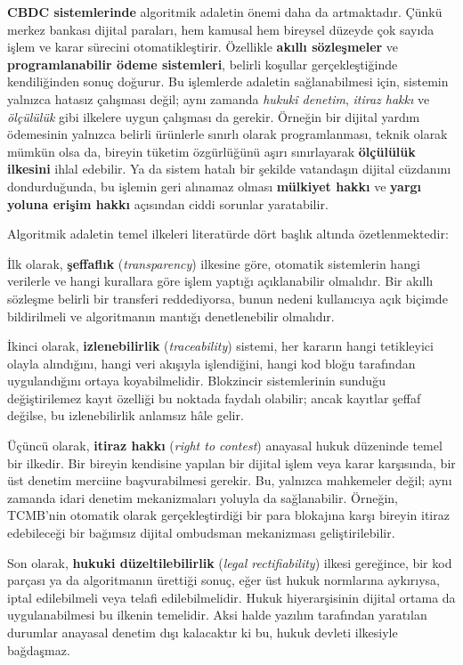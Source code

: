 \documentclass[a4paper,12pt]{article}
\begin{document}
\textbf{CBDC sistemlerinde} algoritmik adaletin önemi daha da artmaktadır. Çünkü merkez bankası dijital paraları, hem kamusal hem bireysel düzeyde çok sayıda işlem ve karar sürecini otomatikleştirir. Özellikle \textbf{akıllı sözleşmeler} ve \textbf{programlanabilir ödeme sistemleri}, belirli koşullar gerçekleştiğinde kendiliğinden sonuç doğurur. Bu işlemlerde adaletin sağlanabilmesi için, sistemin yalnızca hatasız çalışması değil; aynı zamanda \textit{hukukî denetim}, \textit{itiraz hakkı} ve \textit{ölçülülük} gibi ilkelere uygun çalışması da gerekir. Örneğin bir dijital yardım ödemesinin yalnızca belirli ürünlerle sınırlı olarak programlanması, teknik olarak mümkün olsa da, bireyin tüketim özgürlüğünü aşırı sınırlayarak \textbf{ölçülülük ilkesini} ihlal edebilir. Ya da sistem hatalı bir şekilde vatandaşın dijital cüzdanını dondurduğunda, bu işlemin geri alınamaz olması \textbf{mülkiyet hakkı} ve \textbf{yargı yoluna erişim hakkı} açısından ciddi sorunlar yaratabilir.

Algoritmik adaletin temel ilkeleri literatürde dört başlık altında özetlenmektedir:

İlk olarak, \textbf{şeffaflık} (\textit{transparency}) ilkesine göre, otomatik sistemlerin hangi verilerle ve hangi kurallara göre işlem yaptığı açıklanabilir olmalıdır. Bir akıllı sözleşme belirli bir transferi reddediyorsa, bunun nedeni kullanıcıya açık biçimde bildirilmeli ve algoritmanın mantığı denetlenebilir olmalıdır.

İkinci olarak, \textbf{izlenebilirlik} (\textit{traceability}) sistemi, her kararın hangi tetikleyici olayla alındığını, hangi veri akışıyla işlendiğini, hangi kod bloğu tarafından uygulandığını ortaya koyabilmelidir. Blokzincir sistemlerinin sunduğu değiştirilemez kayıt özelliği bu noktada faydalı olabilir; ancak kayıtlar şeffaf değilse, bu izlenebilirlik anlamsız hâle gelir.

Üçüncü olarak, \textbf{itiraz hakkı} (\textit{right to contest}) anayasal hukuk düzeninde temel bir ilkedir. Bir bireyin kendisine yapılan bir dijital işlem veya karar karşısında, bir üst denetim merciine başvurabilmesi gerekir. Bu, yalnızca mahkemeler değil; aynı zamanda idari denetim mekanizmaları yoluyla da sağlanabilir. Örneğin, TCMB'nin otomatik olarak gerçekleştirdiği bir para blokajına karşı bireyin itiraz edebileceği bir bağımsız dijital ombudsman mekanizması geliştirilebilir.

Son olarak, \textbf{hukuki düzeltilebilirlik} (\textit{legal rectifiability}) ilkesi gereğince, bir kod parçası ya da algoritmanın ürettiği sonuç, eğer üst hukuk normlarına aykırıysa, iptal edilebilmeli veya telafi edilebilmelidir. Hukuk hiyerarşisinin dijital ortama da uygulanabilmesi bu ilkenin temelidir. Aksi halde yazılım tarafından yaratılan durumlar anayasal denetim dışı kalacaktır ki bu, hukuk devleti ilkesiyle bağdaşmaz.
\end{document}
